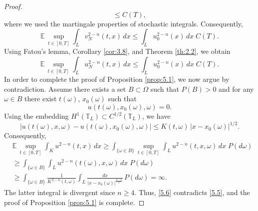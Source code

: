 \documentclass[10pt,a4paper]{amsart}
\def\T{\mathbb{T}_L}
\begin{document}
\begin{proof}
\[\le C(T),
\]
where we used the martingale properties of stochastic integrals.
Consequently,
\[
\mathbb{E}\,\sup_{t\in[0,T]}
\int_{L} v_N^{2-n}(t,x)\,dx
\le
\int_{L} u_0^{2-n}(x)\,dx \; C(T).
\]
Using Fatou's lemma, Corollary \ref{cor:3.8}, and Theorem \ref{th:2.2}, we obtain
\begin{equation}\label{5.5}
\mathbb{E}\,\sup_{t\in[0,T]}
\int_{L} u_N^{2-n}(t,x)\,dx
\le
\int_{L} u_0^{2-n}(x)\,dx \; C(T).
\end{equation}
In order to complete the proof of Proposition \ref{prop:5.1}, we now argue by contradiction. Assume there exists a set $B \subset \Omega$ such that $P(B)>0$ and
for any $\omega\in B$ there exist $t(\omega)$, $x_0(\omega)$ such that
\[
u(t(\omega),x_0(\omega),\omega)=0.
\]
Using the embedding $H^1(\T) \subset C^{1/2}(\T)$, %
we have
\[
|u(t(\omega),x,\omega) - u(t(\omega),x_0(\omega),\omega)|
\le
K(t,\omega)\,|x-x_0(\omega)|^{1/2}.
\]
Consequently, 
\begin{align}\label{5.6}
 \nonumber &  \mathbb{E}\,\sup_{t\in[0,T]}
\int_{K} u^{2-n}(t,x)\,dx
\ge
\int_{\{\omega\in B\}}
\sup_{t\in[0,T]}
\int_{L} u^{2-n}(t,x,\omega)\,dx \; P(d\omega) \\
& \ge \int_{\{\omega\in B\}}
\int_{L} u^{2-n}(t(\omega),x,\omega)\,dx \; P(d\omega) \\
\nonumber & \ge
\int_{\{\omega\in B\}}
\frac{1}{K^{\,2-n}(t,\omega)}
\int_{L}
\frac{dx}{|x-x_0(\omega)|^{\frac{n-2}{2}}}
\,P(d\omega)
= \infty.
\end{align}
The latter integral is divergent since $n \ge 4$. Thus, \eqref{5.6} contradicts   \eqref{5.5}, and the proof of Proposition \ref{prop:5.1} is complete.
\end{proof}
\end{document}

